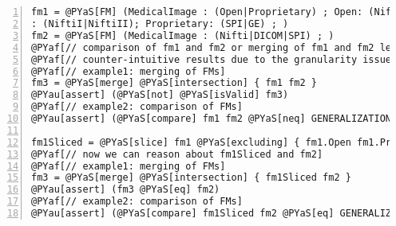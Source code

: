 \documentclass{article}
\begin{document}
\section*{}

\begin{Verbatim}[commandchars=@\[\],numbers=left,firstnumber=1,stepnumber=1]
fm1 = @PYaS[FM] (MedicalImage : (Open|Proprietary) ; Open: (Nifti|DICOM); Nifti
: (NiftiI|NiftiII); Proprietary: (SPI|GE) ; )
fm2 = @PYaS[FM] (MedicalImage : (Nifti|DICOM|SPI) ; )
@PYaf[// comparison of fm1 and fm2 or merging of fm1 and fm2 lead to ]
@PYaf[// counter-intuitive results due to the granularity issue.]
@PYaf[// example1: merging of FMs]
fm3 = @PYaS[merge] @PYaS[intersection] { fm1 fm2 }
@PYau[assert] (@PYaS[not] @PYaS[isValid] fm3)
@PYaf[// example2: comparison of FMs]
@PYau[assert] (@PYaS[compare] fm1 fm2 @PYaS[neq] GENERALIZATION)

fm1Sliced = @PYaS[slice] fm1 @PYaS[excluding] { fm1.Open fm1.Proprietary fm1.NiftiI fm1.NiftiII }
@PYaf[// now we can reason about fm1Sliced and fm2]
@PYaf[// example1: merging of FMs]
fm3 = @PYaS[merge] @PYaS[intersection] { fm1Sliced fm2 }
@PYau[assert] (fm3 @PYaS[eq] fm2)
@PYaf[// example2: comparison of FMs]
@PYau[assert] (@PYaS[compare] fm1Sliced fm2 @PYaS[eq] GENERALIZATION)
\end{Verbatim}
\end{document}
